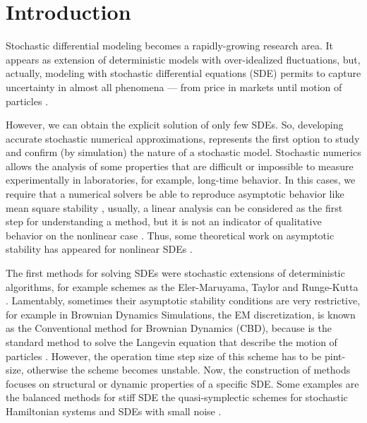 \section{Introduction}
		Stochastic differential modeling becomes  a  rapidly-growing
	research area. It appears  as extension of deterministic models with over-idealized fluctuations, 
	but, actually, modeling with stochastic differential equations (SDE)  permits to capture 
	uncertainty in	almost all phenomena --- from price in markets until motion of particles \cite{Allen2007, 
	Gardiner2009, VanKampen1992}. 

		However, we can obtain the explicit solution of only few SDEs. So, developing accurate stochastic
	numerical approximations, represents  the first option to study and confirm (by simulation) the nature of a 
	stochastic model. Stochastic numerics allows the  analysis of some properties that are
	difficult or impossible to measure experimentally in laboratories, for example,
	long-time behavior. In this cases, we require that a numerical solvers
	be able to reproduce asymptotic behavior like mean square stability \cite{Higham2000,Higham2000b,Saito1996a},
	usually, a linear  analysis can be considered as the first step for understanding a method, but it is not 
	an indicator of qualitative behavior on the nonlinear case \cite{kloeden1999towards}. Thus, some theoretical 
	work on asymptotic	stability has appeared for nonlinear SDEs \citet{Bokor2003} \citet{Buckwar2011a}.  
	
		The first methods for solving SDEs were stochastic extensions of deterministic algorithms,
	for example schemes as the Eler-Maruyama, Taylor and Runge-Kutta \cite{Bokor2003,Burrage2004, Kloeden1992}.
	Lamentably, sometimes their asymptotic stability conditions are very restrictive, for
	example in Brownian Dynamics Simulations, the EM discretization, is known
	as the Conventional method for Brownian Dynamics (CBD), because is the standard method to 
	solve the Langevin equation that describe the motion of particles	\cite{Braanka1998, Bussi2007, Ermak1978}. 
	However, the operation time step size of this scheme has to be pint-size, otherwise the scheme becomes unstable. 
	Now, the construction of methods focuses on structural or dynamic properties of a specific SDE.
	Some examples are the balanced methods for stiff SDE \cite{Milstein1998a} the quasi-symplectic schemes for
	stochastic Hamiltonian systems \cite{Milstein2003} and SDEs with small noise \cite{Buckwar2006b}.
	
